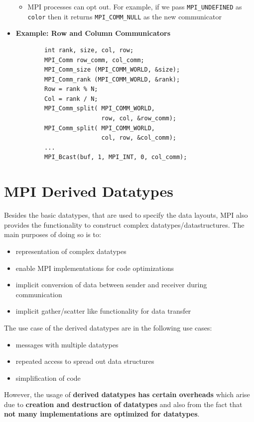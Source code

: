 \documentclass[12pt, a4paper]{report}
\begin{document}
\begin{itemize}
\begin{itemize}
        \item MPI processes can opt out. For example, if we pass \verb$MPI_UNDEFINED$ as \verb$color$ then it returns \verb$MPI_COMM_NULL$ as the new
              communicator 
    \end{itemize}
    \item {\bfseries{Example: Row and Column Communicators}}
    \begin{verbatim}
        int rank, size, col, row;
        MPI_Comm row_comm, col_comm;
        MPI_Comm_size (MPI_COMM_WORLD, &size);
        MPI_Comm_rank (MPI_COMM_WORLD, &rank);
        Row = rank % N;
        Col = rank / N;
        MPI_Comm_split( MPI_COMM_WORLD,
                        row, col, &row_comm);
        MPI_Comm_split( MPI_COMM_WORLD,
                        col, row, &col_comm);
        ...
        MPI_Bcast(buf, 1, MPI_INT, 0, col_comm);
    \end{verbatim}
\end{itemize}

\section{MPI Derived Datatypes}
Besides the basic datatypes, that are used to specify the data layouts, MPI also provides the functionality to construct complex datatypes/datastructures.
The main purposes of doing so is to:
\begin{itemize}
    \item representation of complex datatypes
    \item enable MPI implementations for code optimizations
    \item implicit conversion of data between sender and receiver during communication
    \item implicit gather/scatter like functionality for data transfer
\end{itemize}

The use case of the derived datatypes are in the following use cases:
\begin{itemize}
    \item messages with multiple datatypes
    \item repeated access to spread out data structures
    \item simplification of code
\end{itemize}
However, the usage of {\bfseries{derived datatypes has certain overheads}} which arise due to {\bfseries{creation and destruction of datatypes}} and also from
the fact that {\bfseries{not many implementations are optimized for datatypes}}.
\end{document}
